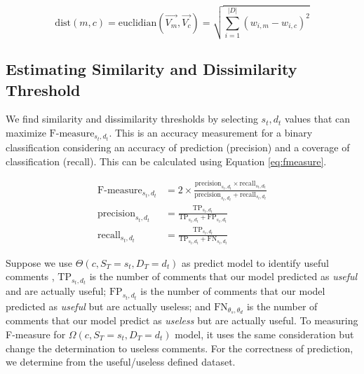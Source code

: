 \begin{equation}
\mathrm{dist}(m,c) = \mathrm{euclidian}(\overrightarrow{V_m},\overrightarrow{V_c}) = \sqrt{\sum_{i=1}^{|D|}(w_{i,m} - w_{i,c})^2}
\label{eq:euclid}
\end{equation}

\subsection{Estimating Similarity and Dissimilarity Threshold}
We find similarity and dissimilarity thresholds by selecting $s_t,d_t$ values that can maximize $\mathrm{F\text{-}measure}_{s_t,d_t}$. This is an accuracy measurement for a binary classification considering an accuracy of prediction (precision) and  a coverage of classification (recall). This can be calculated using Equation \ref{eq:fmeasure}.

\begin{equation}
\begin{split}
\mathrm{F\text{-}measure}_{s_t,d_t} &= 2 \times \frac{\mathrm{precision}_{s_t,d_t} \times \mathrm{recall}_{s_t,d_t}}{\mathrm{precision}_{s_t,d_t} + \mathrm{recall}_{s_t,d_t}}
\\
\mathrm{precision}_{s_t,d_t}  &= \frac{\mathrm{TP}_{s_t,d_t}}{\mathrm{TP}_{s_t,d_t}+\mathrm{FP}_{s_t,d_t}}
\\
\mathrm{recall}_{s_t,d_t}  &= \frac{\mathrm{TP}_{s_t,d_t}}{\mathrm{TP}_{s_t,d_t}+\mathrm{FN}_{s_t,d_t}}
\end{split}
\label{eq:fmeasure}
\end{equation}




Suppose we use $\Theta(c,S_T=s_t,D_T=d_t)$ as predict model to identify useful comments , $\mathrm{TP}_{s_t,d_t}$ is the number of comments that our model predicted as \textit{useful} and are actually useful; $\mathrm{FP}_{s_t,d_t}$ is the number of comments that our model predicted as \textit{useful} but are actually useless; and $\mathrm{FN}_{\theta_s,\theta_d}$ is the number of comments that our model predict as \textit{useless} but are actually useful. To measuring F-measure for $\Omega(c,S_T=s_t,D_T=d_t)$ model, it uses the same consideration but change the determination to useless comments. For the correctness of prediction, we determine from the useful/useless defined dataset. 



